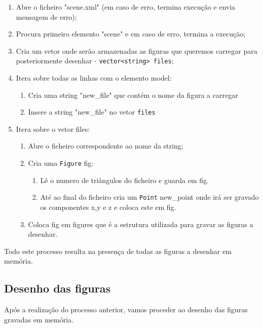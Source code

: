 \documentclass[a4paper]{article}
\begin{document}
\begin{enumerate}
	\item Abre o ficheiro "scene.xml" (em caso de erro, termina execução e envia mensagem de erro);
	\item Procura primeiro elemento "scene" e em caso de erro, termina a execução;
	\item Cria um vetor onde serão armazenadas as figuras que queremos carregar para posteriormente desenhar - \texttt{vector<string> files};
	\item Itera sobre todas as linhas com o elemento model:
	
	\begin{enumerate}
		\item Cria uma string "new\_file" que contém o nome da figura a carregar
		\item Insere a string "new\_file" no vetor \texttt{files}
	\end{enumerate}

	\item Itera sobre o vetor files:

	\begin{enumerate}
		\item Abre o ficheiro correspondente ao nome da string;
		\item Cria uma \texttt{Figure} fig:

		\begin{enumerate}
			\item Lê o numero de triângulos do ficheiro e guarda em fig.
			\item Até ao final do ficheiro cria um \texttt{Point} new\_point onde irá ser gravado os componentes x,y e z e coloca este em fig.
		\end{enumerate}
		\item Coloca fig em figures que é a estrutura utilizada para gravar as figuras a desenhar.
	\end{enumerate}
\end{enumerate}

Todo este processo resulta na presença de todas as figuras a desenhar em memória.

\subsection{Desenho das figuras}

Após a realização do processo anterior, vamos proceder ao desenho das figuras gravadas em memória.
\end{document}
